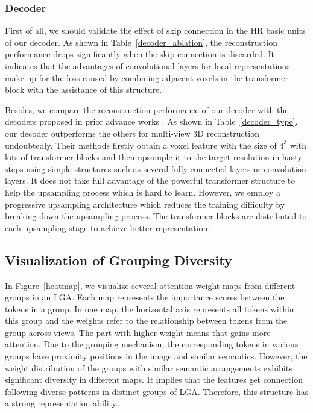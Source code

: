 \documentclass[10pt,twocolumn,letterpaper]{article}
\begin{document}
\begin{figure*}
  \centering
    \caption{Visualization of the attention weight maps from different groups in the $1$-st head of the $2$-nd LGA when processing 3-view input. There is a significant difference in the regions concerned by the attention operations between the groups, which ensures a diversity of the overall features. The complete maps are provided in the supplementary material.} \label{heatmap}
\end{figure*}

\subsubsection{Decoder}
First of all, we should validate the effect of skip connection in the HR basic units of our decoder. As shown in Table~\ref{decoder_ablation}, the reconstruction performance drops significantly when the skip connection is discarded. It indicates that the advantages of convolutional layers for local representations make up for the loss caused by combining adjacent voxels in the transformer block with the assistance of this structure.

Besides, we compare the reconstruction performance of our decoder with the decoders proposed in prior advance works \cite{wang2021multi, yagubbayli2021legoformer, shi20213d}. As shown in Table~\ref{decoder_type}, our decoder outperforms the others for multi-view 3D reconstruction undoubtedly. Their methods firstly obtain a voxel feature with the size of $4^3$ with lots of transformer blocks and then upsample it to the target resolution in hasty steps using simple structures such as several fully connected layers or convolution layers. It does not take full advantage of the powerful transformer structure to help the upsampling process which is hard to learn. However, we employ a progressive upsampling architecture which reduces the training difficulty by breaking down the upsampling process. The transformer blocks are distributed to each upsampling stage to achieve better representation.

\subsection{Visualization of Grouping Diversity} 

In Figure~\ref{heatmap}, we visualize several attention weight maps from different groups in an LGA. Each map represents the importance scores between the tokens in a group. In one map, the horizontal axis represents all tokens within this group and the weights refer to the relationship between tokens from the group across views. The part with higher weight means that gains more attention. Due to the grouping mechanism, the corresponding tokens in various groups have proximity positions in the image and similar semantics. However, the weight distribution of the groups with similar semantic arrangements exhibits significant diversity in different maps. It implies that the features get connection following diverse patterns in distinct groups of LGA. Therefore, this structure has a strong representation ability.
\end{document}
